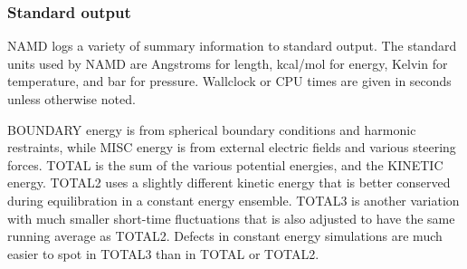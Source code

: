 \begin{itemize}
%
%
%

\end{itemize}

\subsubsection{Standard output}

NAMD logs a variety of summary information to standard output.
The standard units used by NAMD are
Angstroms for length, kcal/mol for energy,
Kelvin for temperature, and bar for pressure.
Wallclock or CPU times are given in seconds unless otherwise noted.

BOUNDARY energy is from spherical boundary conditions and harmonic restraints,
while MISC energy is from external electric fields and various steering forces.
TOTAL is the sum of the various potential energies, and the KINETIC energy.
TOTAL2 uses a slightly different kinetic energy that is better conserved
during equilibration in a constant energy ensemble.
TOTAL3 is another variation with much smaller short-time fluctuations that
is also adjusted to have the same running average as TOTAL2.
Defects in constant energy simulations are much easier to spot in TOTAL3
than in TOTAL or TOTAL2.

